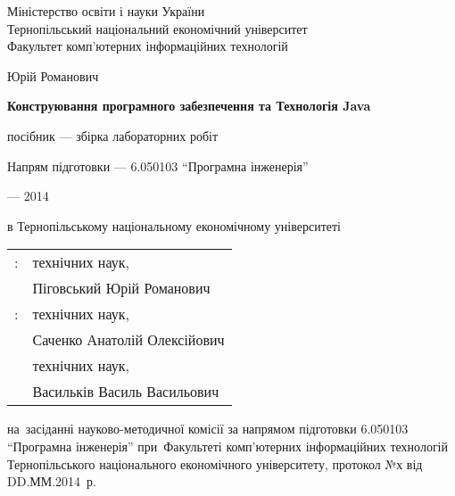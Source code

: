\fontsize{14pt}{15pt}\selectfont  %
\thispagestyle{empty}

\vspace{10mm}
\begin{center}
  Міністерство освіти і науки України \\
Тернопільський національний економічний університет \\
Факультет комп'ютерних інформаційних технологій
\end{center}

\vspace{30mm}
\begin{center}
{\Large{} Юрій Романович}
\end{center}

\vspace{30mm}
\begin{center}
{\bf \LARGE Конструювання програмного забезпечення та Технологія Java
\par}

\vspace{15mm}
 посібник --- збірка лабораторних робіт

\vspace{30mm}
{\Large
Напрям підготовки --- 6.050103 ``Програмна інженерія''
}


\end{center}

\vspace{40mm}
\begin{center}
{ --- 2014}
\end{center}

\newpage

 в Тернопільському національному економічному університеті
\vspace{10mm}
\begin{table} [h]  
  \begin{tabular}{ll}
  \fontsize{14pt}{15pt}: & \fontsize{14pt}{15pt} технічних наук,                     \\
                        & \fontsize{14pt}{15pt} Піговський Юрій Романович
\vspace{3mm} \\
  \fontsize{14pt}{15pt}:& \fontsize{14pt}{15pt} технічних наук,                     \\
                        & \fontsize{14pt}{15pt} Саченко Анатолій Олексійович \vspace{1mm}         \\
                        & \fontsize{14pt}{15pt} технічних наук,                    \\
                        & \fontsize{14pt}{15pt} Васильків Василь Васильович \vspace{3mm}                
  \end{tabular}  
\end{table}

\vspace{20mm}
 на~засіданні науково-методичної комісії за напрямом підготовки \mbox{6.050103} ``Програмна інженерія'' при~Факультеті комп'ютерних інформаційних технологій Тернопільського національного економічного університету, протокол №х від DD.ММ.2014~р.


